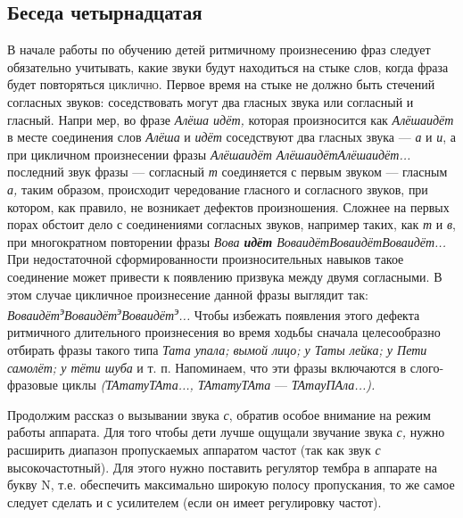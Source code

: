 \documentclass{book}
\renewcommand{\emph}[1]{\textit{#1}}
\begin{document}
\subsection*{Беседа четырнадцатая}

В начале работы по обучению детей ритмичному произнесению фраз следует
обязательно учитывать, какие звуки будут находиться на стыке слов, когда
фраза будет повторяться \textsc{циклично.} Первое время на стыке не
должно быть стечений согласных звуков: соседствовать могут два гласных
звука или согласный и гласный. Напри мер, во фразе \emph{Алёша идёт,}
которая произносится как \emph{Алёшаидёт} в месте соединения слов
\emph{Алёша} и \emph{идёт} соседствуют два гласных звука --- \emph{а} и
\emph{и}, а при цикличном произнесении фразы \emph{Алёшаидёт
АлёшаидётАлёшаидёт...} последний звук фразы --- согласный \emph{т}
соединяется с первым звуком --- гласным \emph{а,} таким образом,
происходит чередование гласного и согласного звуков, при котором, как
правило, не возникает дефектов произношения. Сложнее на первых порах
обстоит дело с соединениями согласных звуков, например таких, как
\emph{т} и \emph{в}, при многократном повторении фразы \emph{Вова
\textbf{идёт} ВоваидётВоваидётВоваидёт...} При недостаточной
сформированности произносительных навыков такое соединение может
привести к появлению призвука между двумя согласными. В этом случае
цикличное произнесение данной фразы выглядит так:
\emph{Воваидёт\textsuperscript{э}Воваидёт\textsuperscript{э}Воваидёт\textsuperscript{э}...}
Чтобы избежать появления этого дефекта ритмичного длительного
произнесения во время ходьбы сначала целесообразно отбирать фразы такого
типа \emph{Тата упала; вымой лицо; у Таты лейка; у Пети самолёт; у тёти
шуба} и т. п. Напоминаем, что эти фразы включаются в слого-фразовые
циклы \emph{(ТАтатуТАта..., ТАтатуТАта} --- \emph{ТАтауПАла...).}

Продолжим рассказ о вызывании звука \emph{с}, обратив особое внимание на
режим работы аппарата. Для того чтобы дети лучше ощущали звучание звука
\emph{с,} нужно расширить диапазон пропускаемых аппаратом частот (так
как звук \emph{с} высокочастотный). Для этого нужно поставить регулятор
тембра в аппарате на букву N, т.е. обеспечить максимально широкую полосу
пропускания, то же самое следует сделать и с усилителем (если он имеет
регулировку частот).
\end{document}
